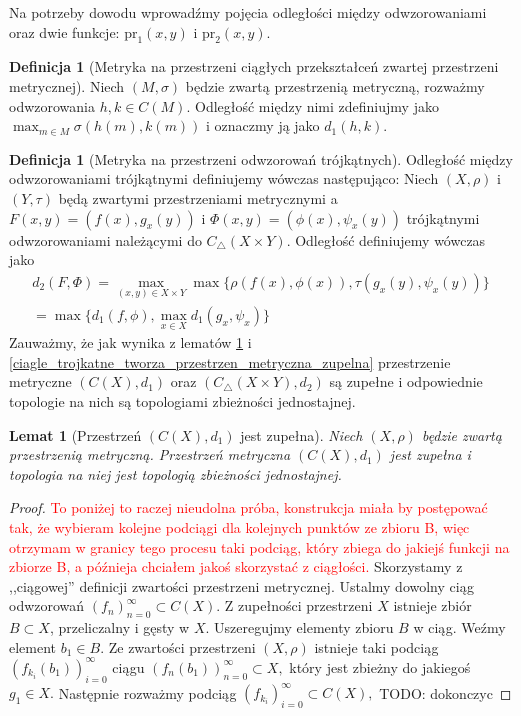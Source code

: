 \documentclass[licencjacka]{pwr_wmat_praca_dyplomowa}
\theoremstyle{plain}
\numberwithin{theorem}{chapter}
\newtheorem{lemma}[theorem]{Lemat}
\theoremstyle{definition}
\numberwithin{theorem}{chapter}
\newtheorem{definition}[theorem]{Definicja}
\begin{document}
Na potrzeby dowodu wprowadźmy pojęcia odległości między odwzorowaniami oraz dwie funkcje: $\textrm{pr}_1(x, y)$ i $\textrm{pr}_2(x, y)$. 

\begin{definition}[Metryka na przestrzeni ciągłych przekształceń zwartej przestrzeni metrycznej]
Niech $(M, \sigma)$ będzie zwartą przestrzenią metryczną, rozważmy odwzorowania $h,k \in C(M)$. Odległość między nimi zdefiniujmy jako $\max_{m \in M} \sigma(h(m), k(m))$ i oznaczmy ją jako $d_1(h,k)$.
\end{definition}


\begin{definition}[Metryka na przestrzeni odwzorowań trójkątnych]
Odległość między odwzorowaniami trójkątnymi definiujemy wówczas następująco: Niech $(X, \rho)$ i $(Y, \tau)$ będą zwartymi przestrzeniami metrycznymi a $F(x,y) = (f(x), g_x(y))$ i $\Phi(x,y) = (\phi(x), \psi_x(y))$ trójkątnymi odwzorowaniami należącymi do $C_\triangle(X \times Y)$. Odległość definiujemy wówczas jako 
\begin{align*}
d_2(F, \Phi) = \max_{(x,y) \in X \times Y} \max\{\rho(f(x),\phi(x)), \tau(g_x(y), \psi_x(y))\} \\ 
= \max\{d_1(f,\phi), \max_{x \in X}d_1(g_x, \psi_x)\}
\end{align*}
Zauważmy, że jak wynika z lematów \ref{przestrzen_ciaglych_jest_zupelna} i \ref{ciagle_trojkatne_tworza_przestrzen_metryczna_zupelna} przestrzenie metryczne $(C(X), d_1)$ oraz $(C_\triangle(X \times Y), d_2)$ są zupełne i odpowiednie topologie na nich są topologiami zbieżności jednostajnej.
\end{definition}


\begin{lemma}[Przestrzeń $(C(X), d_1)$ jest zupełna]\label{przestrzen_ciaglych_jest_zupelna}
Niech $(X, \rho)$ będzie zwartą przestrzenią metryczną. Przestrzeń metryczna $(C(X), d_1)$ jest zupełna i topologia na niej jest topologią zbieżności jednostajnej.
\end{lemma}

\begin{proof}
\textcolor{red}{To poniżej to raczej nieudolna próba, konstrukcja miała by postępować tak, że wybieram kolejne podciągi dla kolejnych punktów ze zbioru B, więc otrzymam w granicy tego procesu taki podciąg, który zbiega do jakiejś funkcji na zbiorze B, a późnieja chciałem jakoś skorzystać z ciągłości.}
Skorzystamy z ,,ciągowej'' definicji zwartości przestrzeni metrycznej. 
Ustalmy dowolny ciąg odwzorowań $(f_n)_{n=0}^{\infty} \subset C(X).$ Z zupełności przestrzeni $X$ istnieje zbiór $B \subset X$, przeliczalny i gęsty w $X.$ Uszeregujmy elementy zbioru $B$ w ciąg. Weźmy element $b_1 \in B.$ Ze zwartości przestrzeni $(X, \rho)$ istnieje taki podciąg $(f_{k_i}(b_1))_{i=0}^{\infty}$ ciągu $(f_n(b_1))_{n=0}^{\infty} \subset X,$ który jest zbieżny do jakiegoś $g_1 \in X.$ Następnie rozważmy podciąg $(f_{k_i})_{i=0}^{\infty} \subset C(X),$ 
TODO: dokonczyc
\end{proof}
\end{document}
